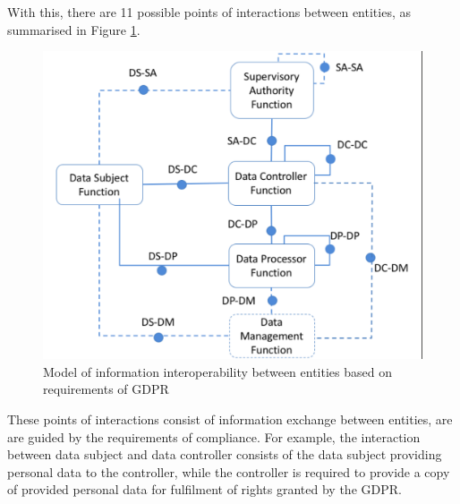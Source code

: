 With this, there are 11 possible points of interactions between entities, as summarised in Figure \ref{fig:info:interoperability-model}.
\begin{figure}[htbp]
    \centering
    \includegraphics[width=0.75\linewidth]{img/interoperability-model.png}
    \caption{Model of information interoperability between entities based on requirements of GDPR \cite{pandit_exploration_2018}}
    \label{fig:info:interoperability-model}
\end{figure}
These points of interactions consist of information exchange between entities, are are guided by the requirements of compliance. For example, the interaction between data subject and data controller consists of the data subject providing personal data to the controller, while the controller is required to provide a copy of provided personal data for fulfilment of rights granted by the GDPR.

